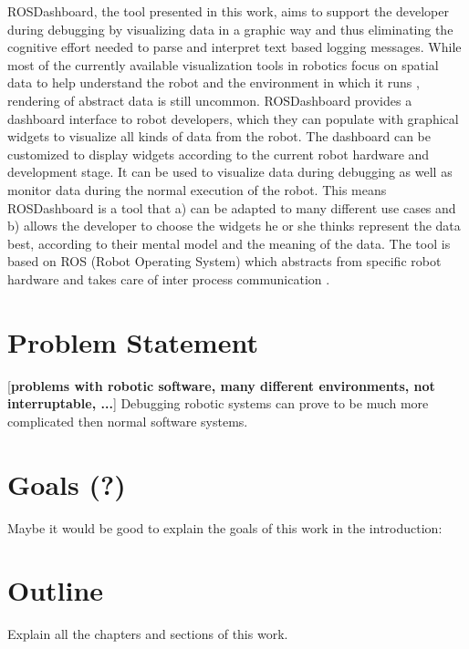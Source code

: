 ROSDashboard, the tool presented in this work, aims to support the developer during debugging by visualizing data in a graphic way and thus eliminating the cognitive effort needed to parse and interpret text based logging messages. While most of the currently available visualization tools in robotics focus on spatial data to help understand the robot and the environment in which it runs \cite{Collett2010, Quigley2009}, rendering of abstract data is still uncommon. ROSDashboard provides a dashboard interface to robot developers, which they can populate with graphical widgets to visualize all kinds of data from the robot. The dashboard can be customized to display widgets according to the current robot hardware and development stage. It can be used to visualize data during debugging as well as monitor data during the normal execution of the robot. This means ROSDashboard is a tool that a) can be adapted to many different use cases and b) allows the developer to choose the widgets he or she thinks represent the data best, according to their mental model and the meaning of the data. The tool is based on ROS (Robot Operating System) which abstracts from specific robot hardware and takes care of inter process communication \cite{Quigley2009}.

\section{Problem Statement}
\label{problem_statement}
[\textbf{problems with robotic software, many different environments, not interruptable, ...}]
Debugging robotic systems can prove to be much more complicated then normal software systems. 

\section{Goals (?)}
Maybe it would be good to explain the goals of this work in the introduction: 

\section{Outline}
Explain all the chapters and sections of this work.
